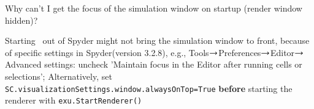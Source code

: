   \item Why can't I get the focus of the simulation window on startup (render window hidden)?
	\bi
	\item[$\ra$] Starting \codeName\ out of Spyder might not bring the simulation window to front, because of specific settings in Spyder(version 3.2.8), e.g., Tools$\ra$Preferences$\ra$Editor$\ra$Advanced settings: uncheck 'Maintain focus in the Editor after running cells or selections'; Alternatively, set \texttt{SC.visualizationSettings.window.alwaysOnTop=True} {\bf before} starting the renderer with \texttt{exu.StartRenderer()}
	\ei
\en


